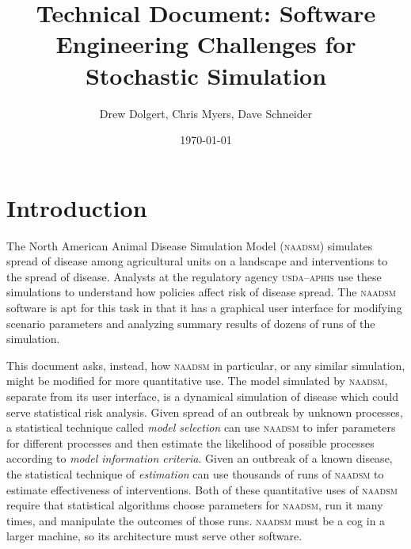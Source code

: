 \documentclass{article}
\title{Technical Document: Software Engineering Challenges for Stochastic Simulation}
\author{Drew Dolgert, Chris Myers, Dave Schneider}
\date{\today}
\begin{document}
\maketitle

\newcommand{\naadsm}{\textsc{naadsm}\xspace}
\newcommand{\adct}{\textsc{adct}\xspace}
\newcommand{\hpai}{\textsc{hpai}\xspace}
\newcommand{\fmd}{\textsc{fmd}\xspace}
\newcommand{\gui}{\textsc{gui}\xspace}
\newcommand{\nsc}{\textsc{sc}\xspace}
\newcommand{\CC}{C\nolinebreak\hspace{-.05em}\raisebox{.4ex}{\tiny\bf +}\nolinebreak\hspace{-.10em}\raisebox{.4ex}{\tiny\bf +}\xspace}

\tableofcontents

\section{Introduction}
The North American Animal Disease Simulation Model (\naadsm)
simulates spread of disease among agricultural units on a
landscape and interventions to the spread of disease\cite{naadsm}.
Analysts at the regulatory agency \textsc{usda--aphis} use
these simulations to understand how policies affect
risk of disease spread. The \naadsm software is apt for this
task in that it has a graphical user interface for modifying
scenario parameters and analyzing summary results of dozens of
runs of the simulation.

This document asks, instead, how \naadsm in particular,
or any similar simulation, might be modified for more
quantitative use. 
The model simulated by \naadsm, separate from its user
interface, is a dynamical simulation of disease which
could serve statistical risk analysis.
Given spread of an outbreak by unknown processes, a statistical
technique called \emph{model selection} can use \naadsm
to infer parameters for different processes and then estimate
the likelihood of possible processes according to \emph{model
information criteria}. Given an outbreak of a known disease,
the statistical technique of \emph{estimation} can use thousands
of runs of \naadsm to estimate effectiveness of interventions.
Both of these quantitative uses of \naadsm require that statistical
algorithms choose parameters for \naadsm, run it many times, and
manipulate the outcomes of those runs. \naadsm must be a cog
in a larger machine, so its architecture must serve other software.
\end{document}
